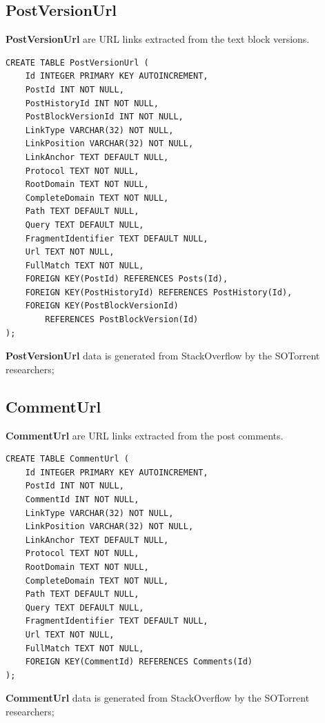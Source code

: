 \documentclass[a4paper,11pt, notitlepage]{report}
\theoremstyle{definition}
\numberwithin{equation}{section}		%
\begin{document}
\subsection{PostVersionUrl}
\textbf{PostVersionUrl} are URL links extracted from the text block versions.
\begin{lstlisting}
CREATE TABLE PostVersionUrl (
    Id INTEGER PRIMARY KEY AUTOINCREMENT,
    PostId INT NOT NULL,
    PostHistoryId INT NOT NULL,
    PostBlockVersionId INT NOT NULL,
    LinkType VARCHAR(32) NOT NULL,
    LinkPosition VARCHAR(32) NOT NULL,
    LinkAnchor TEXT DEFAULT NULL,
    Protocol TEXT NOT NULL,
    RootDomain TEXT NOT NULL,
    CompleteDomain TEXT NOT NULL,
    Path TEXT DEFAULT NULL,
    Query TEXT DEFAULT NULL,
    FragmentIdentifier TEXT DEFAULT NULL,
    Url TEXT NOT NULL,
    FullMatch TEXT NOT NULL,
    FOREIGN KEY(PostId) REFERENCES Posts(Id),
    FOREIGN KEY(PostHistoryId) REFERENCES PostHistory(Id),
    FOREIGN KEY(PostBlockVersionId)
        REFERENCES PostBlockVersion(Id)
);
\end{lstlisting}
\textbf{PostVersionUrl} data is generated from StackOverflow by the SOTorrent researchers;

\subsection{CommentUrl}
\textbf{CommentUrl} are URL links extracted from the post comments.
\begin{lstlisting}
CREATE TABLE CommentUrl (
    Id INTEGER PRIMARY KEY AUTOINCREMENT,
    PostId INT NOT NULL,
    CommentId INT NOT NULL,
    LinkType VARCHAR(32) NOT NULL,
    LinkPosition VARCHAR(32) NOT NULL,
    LinkAnchor TEXT DEFAULT NULL,
    Protocol TEXT NOT NULL,
    RootDomain TEXT NOT NULL,
    CompleteDomain TEXT NOT NULL,
    Path TEXT DEFAULT NULL,
    Query TEXT DEFAULT NULL,
    FragmentIdentifier TEXT DEFAULT NULL,
    Url TEXT NOT NULL,
    FullMatch TEXT NOT NULL,
    FOREIGN KEY(CommentId) REFERENCES Comments(Id)
);
\end{lstlisting}
\textbf{CommentUrl} data is generated from StackOverflow by the SOTorrent researchers;
\end{document}
